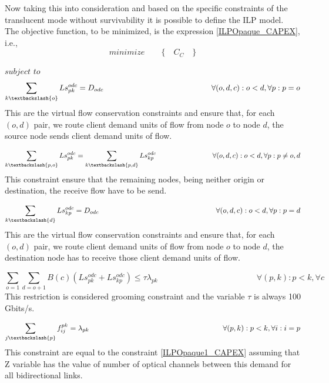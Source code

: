 Now taking this into consideration and based on the specific constraints of the translucent mode without survivability it is possible to define the ILP model.\\
\newpage
The objective function, to be minimized, is the expression \ref{ILPOpaque_CAPEX}, i.e.,
\begin{equation*}
  minimize \qquad \Big\{ \quad C_C \quad \Big\}
\end{equation*}

$subject$ $to$
\begin{equation}
\sum_{k\textbackslash \{o\}} Ls_{pk}^{odc} = D_{odc} \qquad \qquad \qquad \qquad \qquad \qquad \qquad
\forall(o,d,c) : o < d, \forall p: p = o
\label{ILPTransluc1}
\end{equation}
\noindent
This are the virtual flow conservation constraints and ensure that, for each $(o,d)$ pair, we route client demand units of flow from node $o$ to node $d$, the source node sends client demand units of flow.

\begin{equation}
\sum_{k\textbackslash \{p,o\}} Ls_{pk}^{odc} = \sum_{k\textbackslash \{p,d\}} Ls_{kp}^{odc} \qquad \qquad \qquad \qquad
\forall(o,d,c) : o < d, \forall p: p \neq o,d
\label{ILPTransluc2}
\end{equation}
\noindent
This constraint ensure that the remaining nodes, being neither origin or destination, the receive flow have to be send.

\begin{equation}
\sum_{k\textbackslash \{d\}} Ls_{kp}^{odc} = D_{odc} \qquad \qquad \qquad \qquad \qquad \qquad \qquad \qquad
\forall(o,d,c) : o < d, \forall p: p = d
\label{ILPTransluc3}
\end{equation}
\noindent
This are the virtual flow conservation constraints and ensure that, for each $(o,d)$ pair, we route client demand units of flow from node $o$ to node $d$, the destination node has to receive those client demand units of flow.

\begin{equation}
\sum_{o=1} \sum_{d=o+1} B(c)(Ls_{pk}^{odc} + Ls_{kp}^{odc}) \leq  \tau \lambda_{pk} \qquad \qquad \qquad \qquad \qquad \qquad
\forall (p,k) : p < k, \forall c
\label{ILPTransluc4}
\end{equation}
\noindent
This restriction is considered grooming constraint and the variable $\tau$ is always 100 Gbits/s.

\begin{equation}
\sum_{j\textbackslash \{p\}} f_{ij}^{pk} = \lambda_{pk}  \qquad \qquad \qquad \qquad \qquad \qquad \qquad \qquad \qquad
\forall(p,k) : p < k, \forall i: i = p
\label{ILPTransluc6}
\end{equation}
\noindent
This constraint are equal to the constraint \ref{ILPOpaque1_CAPEX} assuming that Z variable has the value of number of optical channels between this demand for all bidirectional links.

